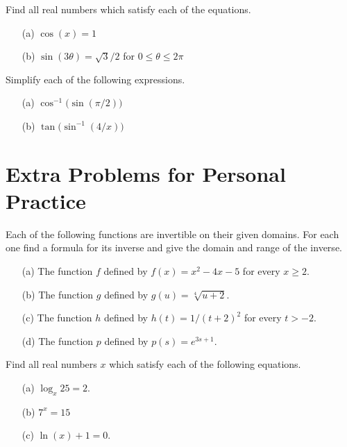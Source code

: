 \documentclass[handout]{ximera}
\begin{document}
\begin{problem}
  \label{problem:solving-trigonometric-equations}
  Find all real numbers which satisfy each of the equations.
  \begin{itemize}
    \item[(a)]
      $\cos(x) = 1$
    \item[(b)]
      $\sin(3 \theta) = \sqrt{3}/2$ for $0 \leq \theta \leq 2\pi$
  \end{itemize}
\end{problem}

\begin{problem}
  \label{problem:simplifying-trigonometric-expressions}
  Simplify each of the following expressions.
  \begin{itemize}
    \item[(a)]
      $\cos^{-1} \bigl( \sin(\pi/2) \bigr)$
    \item[(b)]
      $\tan \bigl( \sin^{-1}(4/x ) \bigr)$
  \end{itemize}
\end{problem}

\section{Extra Problems for  Personal Practice}
\label{section:extra-problems}

\begin{problem}
  \label{problem:computing-inverse-algebraically}
  Each of the following functions are invertible on their given domains.
  For each one find a formula for its inverse and give the domain and range of the inverse.
  \begin{itemize}
    \item[(a)]
      The function $f$ defined by $f(x)=x^2-4x-5$ for every $x \ge 2$.

    \item[(b)]
      The function $g$ defined by $g(u) = \sqrt[4]{u + 2}$.

    \item[(c)]
      The function $h$ defined by $h(t) = 1/(t+2)^2$ for every $t > -2$.

    \item[(d)]
      The function $p$ defined by $p(s) = e^{3s+1}$.
  \end{itemize}
\end{problem}

\begin{problem}
  \label{problem:solving-logarithmic-exponential-equations}
  Find all real numbers $x$ which satisfy each of the following equations.
  \begin{itemize}
    \item[(a)]
      $\log_x 25 = 2$.

    \item[(b)]
      $7^x = 15$

    \item[(c)]
      $\ln(x) + 1 = 0$.
  \end{itemize}
\end{problem}
\end{document}
